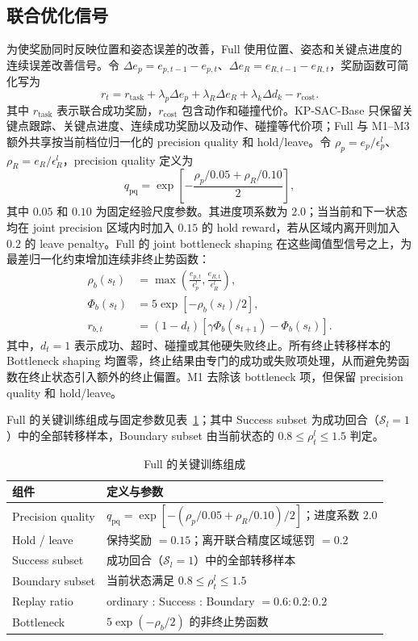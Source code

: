 \documentclass[conference]{IEEEtran}
\begin{document}
\subsection{联合优化信号}
为使奖励同时反映位置和姿态误差的改善，Full 使用位置、姿态和关键点进度的连续误差改善信号。令 $\Delta e_p=e_{p,t-1}-e_{p,t}$、$\Delta e_R=e_{R,t-1}-e_{R,t}$，奖励函数可简化写为
\begin{equation}
r_t=r_{\mathrm{task}}+\lambda_p\Delta e_p+\lambda_R\Delta e_R
 +\lambda_k\Delta d_k-r_{\mathrm{cost}} .
\label{eq:reward}
\end{equation}
其中 $r_{\mathrm{task}}$ 表示联合成功奖励，$r_{\mathrm{cost}}$ 包含动作和碰撞代价。KP-SAC-Base 只保留关键点跟踪、关键点进度、连续成功奖励以及动作、碰撞等代价项；Full 与 M1--M3 额外共享按当前档位归一化的 precision quality 和 hold/leave。令 $\rho_p=e_p/\epsilon_p^l$、$\rho_R=e_R/\epsilon_R^l$，precision quality 定义为
\begin{equation}
q_{\mathrm{pq}}=\exp\left[-\frac{\rho_p/0.05+\rho_R/0.10}{2}\right],
\end{equation}
其中 $0.05$ 和 $0.10$ 为固定经验尺度参数。其进度项系数为 $2.0$；当当前和下一状态均在 joint precision 区域内时加入 $0.15$ 的 hold reward，若从区域内离开则加入 $0.2$ 的 leave penalty。Full 的 joint bottleneck shaping 在这些阈值型信号之上，为最差归一化约束增加连续非终止势函数：
\begin{align}
\rho_b(s_t)&=\max\left(\frac{e_{p,t}}{\epsilon_p^l},\frac{e_{R,t}}{\epsilon_R^l}\right),\\
\Phi_b(s_t)&=5\exp[-\rho_b(s_t)/2],\\
r_{b,t}&=(1-d_t)[\gamma\Phi_b(s_{t+1})-\Phi_b(s_t)].
\label{eq:bottleneck}
\end{align}
其中，$d_t=1$ 表示成功、超时、碰撞或其他硬失败终止。所有终止转移样本的 Bottleneck shaping 均置零，终止结果由专门的成功或失败项处理，从而避免势函数在终止状态引入额外的终止偏置。M1 去除该 bottleneck 项，但保留 precision quality 和 hold/leave。

Full 的关键训练组成与固定参数见表~\ref{tab:fullcomponents}；其中 Success subset 为成功回合（$\mathcal{S}_l=1$）中的全部转移样本，Boundary subset 由当前状态的 $0.8\leq\rho_t^l\leq1.5$ 判定。

\begin{table}[t]
\caption{Full 的关键训练组成}
\label{tab:fullcomponents}
\centering
\small
\begin{tabular}{p{}|p{}}
\toprule
组件 & 定义与参数\\
\midrule
Precision quality & $q_{\mathrm{pq}}=\exp[-(\rho_p/0.05+\rho_R/0.10)/2]$；进度系数 $2.0$\\
Hold / leave & 保持奖励 $=0.15$；离开联合精度区域惩罚 $=0.2$\\
Success subset & 成功回合（$\mathcal{S}_l=1$）中的全部转移样本\\
Boundary subset & 当前状态满足 $0.8\leq\rho_t^l\leq1.5$\\
Replay ratio & ordinary : Success : Boundary $=0.6:0.2:0.2$\\
Bottleneck & $5\exp(-\rho_b/2)$ 的非终止势函数\\
\bottomrule
\end{tabular}
\end{table}
\end{document}
